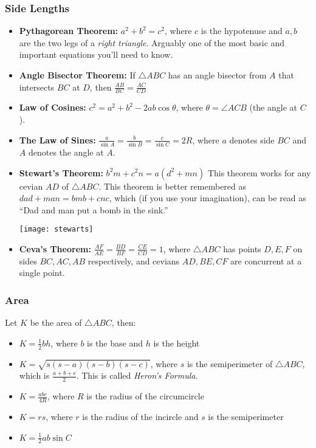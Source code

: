 \subsubsection{Side Lengths}
\begin{itemize}
    \item \textbf{Pythagorean Theorem:} $\displaystyle a^2+b^2=c^2$, where $c$ is the hypotenuse and $a, b$ are the two legs of a \textit{right triangle}. Arguably one of the most basic and important equations you'll need to know.
    \item \textbf{Angle Bisector Theorem:} If $\bigtriangleup ABC$ has an angle bisector from $A$ that intersects $BC$ at  $D$, then $\displaystyle \frac{AB}{BC} = \frac{AC}{CD}$ 
    \item \textbf{Law of Cosines: } $\displaystyle c^2 = a^2+b^2-2ab\cos\theta$, where $\theta=\angle ACB$ (the angle at $C$).
    \item \textbf{The Law of Sines: } $\displaystyle \frac{a}{\sin A} = \frac{b}{\sin B} = \frac{c}{\sin C} = 2R$, where $a$ denotes side $BC$ and $A$ denotes the angle at $A$.
    \item \textbf{Stewart's Theorem:} $b^2m + c^2n = a(d^2 + mn)$ This theorem works for any cevian $AD$ of $\bigtriangleup ABC$. This theorem is better remembered as $dad+man=bmb+cnc$, which (if you use your imagination), can be read as ``Dad and man put a bomb in the sink.''
    \begin{center}
    \texttt{[image: stewarts]}
    \end{center}
    \item \textbf{Ceva's Theorem:} $\frac{AF}{AE} = \frac{BD}{BF} = \frac{CE}{CD} = 1$, where $\bigtriangleup ABC$ has points $D, E, F$ on sides $BC, AC, AB$ respectively, and cevians $AD, BE, CF$ are concurrent at a single point.
\end{itemize}
\subsubsection{Area}
Let $K$ be the area of $\bigtriangleup ABC$, then:
\begin{itemize}
    \item $\displaystyle K = \frac{1}{2}bh$, where $b$ is the base and $h$ is the height
    \item $\displaystyle K = \sqrt{s(s-a)(s-b)(s-c)}$, where $s$ is the semiperimeter of $\bigtriangleup ABC$, which is $\frac{a+b+c}{2}$. This is called \textit{Heron's Formula}.
    \item $\displaystyle K = \frac{abc}{4R}$, where $R$ is the radius of the circumcircle
    \item $\displaystyle K = rs$, where $r$ is the radius of the incircle and $s$ is the semiperimeter
    \item $\displaystyle K = \frac{1}{2}ab\sin C$
\end{itemize}


